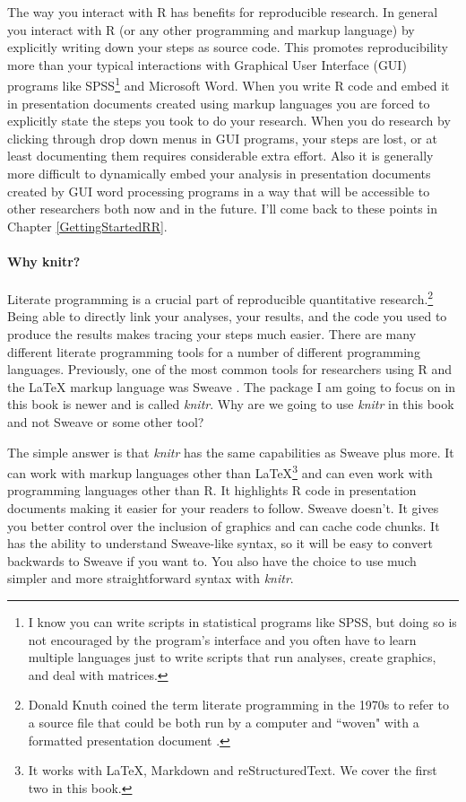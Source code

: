 The way you interact with R has benefits for reproducible research. In general you interact with R (or any other programming and markup language) by explicitly writing down your steps as source code. This promotes reproducibility more than your typical interactions with Graphical User Interface (GUI) programs like SPSS\footnote{I know you can write scripts in statistical programs like SPSS, but doing so is not encouraged by the program's interface and you often have to learn multiple languages just to write scripts that run analyses, create graphics, and deal with matrices.} and Microsoft Word. When you write R code and embed it in presentation documents created using markup languages you are forced to explicitly state the steps you took to do your research. When you do research by clicking through drop down menus in GUI programs, your steps are lost, or at least documenting them requires considerable extra effort. Also it is generally more difficult to dynamically embed your analysis in presentation documents created by GUI word processing programs in a way that will be accessible to other researchers both now and in the future. I'll come back to these points in Chapter \ref{GettingStartedRR}.

\paragraph{Why knitr?}

Literate programming is a crucial part of reproducible quantitative research.\footnote{Donald Knuth coined the term literate programming in the 1970s to refer to a source file that could be both run by a computer and ``woven" with a formatted presentation document \cite[]{Knuth1992}.} Being able to directly link your analyses, your results, and the code you used to produce the results makes tracing your steps much easier. There are many different literate programming tools for a number of different programming languages. Previously, one of the most common tools for researchers using R and the LaTeX markup language was Sweave \cite[]{Leisch2002}. The package I am going to focus on in this book is newer and is called {\emph{knitr}}. Why are we going to use {\emph{knitr}} in this book and not Sweave or some other tool?

The simple answer is that {\emph{knitr}} has the same capabilities as Sweave plus more. It can work with markup languages other than LaTeX\footnote{It works with LaTeX, Markdown and reStructuredText. We cover the first two in this book.} and can even work with programming languages other than R. It highlights R code in presentation documents making it easier for your readers to follow. Sweave doesn't. It gives you better control over the inclusion of graphics and can cache code chunks. It has the ability to understand Sweave-like syntax, so it will be easy to convert backwards to Sweave if you want to. You also have the choice to use much simpler and more straightforward syntax with {\emph{knitr}}. 

